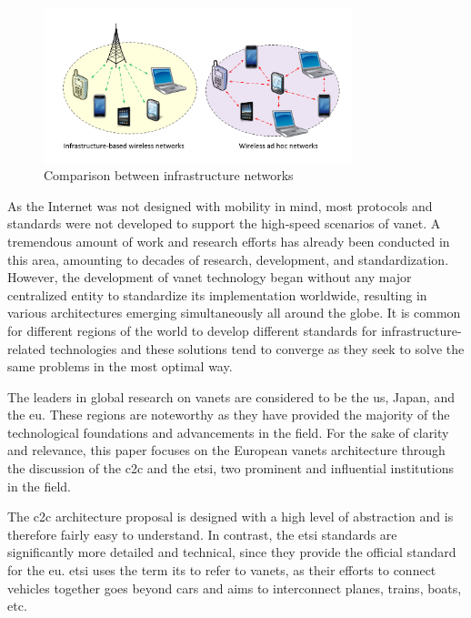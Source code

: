 \begin{figure}[htbp]
	\centering
	\includegraphics[width=0.8\textwidth]{Chapters/Figures/VANETs/ad_hoc_networks.png}
	\caption{Comparison between infrastructure networks~\cite{dinh_thai_applications_2015}}
	\label{fig:ad_hoc}
\end{figure}


As the Internet was not designed with mobility in mind, most protocols and standards were not developed to support the high-speed scenarios of \gls{vanet}. A tremendous amount of work and research efforts has already been conducted in this area, amounting to decades of research, development, and standardization. However, the development of \gls{vanet} technology began without any major centralized entity to standardize its implementation worldwide, resulting in various architectures emerging simultaneously all around the globe. It is common for different regions of the world to develop different standards for infrastructure-related technologies and these solutions tend to converge as they seek to solve the same problems in the most optimal way. 

The leaders in global research on \glspl{vanet} are considered to be the \gls{us}, Japan, and the \gls{eu}. These regions are noteworthy as they have provided the majority of the technological foundations and advancements in the field. For the sake of clarity and relevance, this paper focuses on the European \glspl{vanet} architecture through the discussion of the \gls{c2c} and the \gls{etsi}, two prominent and influential institutions in the field. 

The \gls{c2c} architecture proposal is designed with a high level of abstraction and is therefore fairly easy to understand. In contrast, the \gls{etsi} standards are significantly more detailed and technical, since they provide the official standard for the \gls{eu}. \gls{etsi} uses the term \gls{its} to refer to \glspl{vanet}, as their efforts to connect vehicles together goes beyond cars and aims to interconnect planes, trains, boats, etc.

